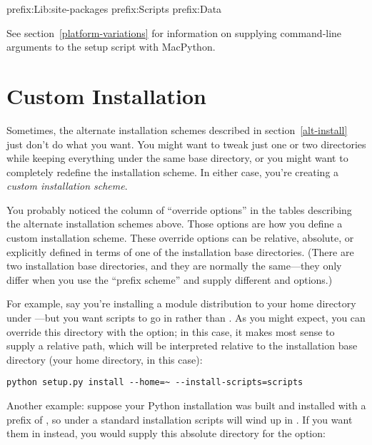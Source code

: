 \documentclass{howto}
\begin{document}
              {prefix}{:Lib:site-packages}
              {prefix}{:Scripts}
              {prefix}{:Data}

See section~\ref{platform-variations} for information on supplying
command-line arguments to the setup script with MacPython.


\section{Custom Installation}
\label{custom-install}

Sometimes, the alternate installation schemes described in
section~\ref{alt-install} just don't do what you want.  You might
want to tweak just one or two directories while keeping everything under
the same base directory, or you might want to completely redefine the
installation scheme.  In either case, you're creating a \emph{custom
  installation scheme}.

You probably noticed the column of ``override options'' in the tables
describing the alternate installation schemes above.  Those options are
how you define a custom installation scheme.  These override options can
be relative, absolute, or explicitly defined in terms of one of the
installation base directories.  (There are two installation base
directories, and they are normally the same---they only differ when you
use the \UNIX{} ``prefix scheme'' and supply different
 and  options.)

For example, say you're installing a module distribution to your home
directory under \UNIX---but you want scripts to go in
 rather than .
As you might expect, you can override this directory with the
 option; in this case, it makes most
sense to supply a relative path, which will be interpreted relative to
the installation base directory (your home directory, in this case):

\begin{verbatim}
python setup.py install --home=~ --install-scripts=scripts
\end{verbatim}

Another \UNIX{} example: suppose your Python installation was built and
installed with a prefix of , so under a standard 
installation scripts will wind up in .  If
you want them in  instead, you would supply this
absolute directory for the  option:
\end{document}
